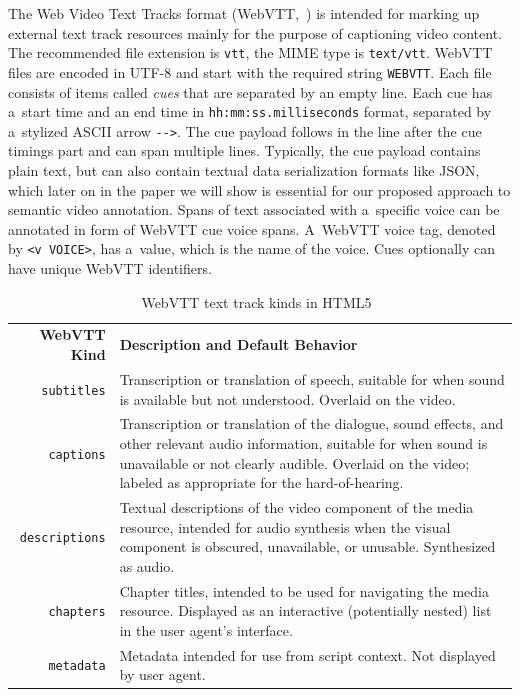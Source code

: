 \documentclass[runningheads,a4paper]{llncs}
\begin{document}
The Web Video Text Tracks format (WebVTT,~\cite{pfeiffer2013webvtt})
is intended for marking up external text track resources mainly
for the purpose of captioning video content.
The recommended file extension is \texttt{vtt},
the MIME type is \texttt{text/vtt}.
WebVTT files are encoded in UTF-8 and
start with the required string \texttt{WEBVTT}.
Each file consists of items called \emph{cues}
that are separated by an empty line.
Each cue has a~start time and an end time in
\texttt{hh:mm:ss.milliseconds} format,
separated by a~stylized ASCII arrow \texttt{-}\texttt{->}.
The cue payload follows in the line after the cue timings part
and can span multiple lines.
Typically, the cue payload contains plain text,
but can also contain textual data serialization formats like JSON,
which later on in the paper we will show is essential
for our proposed approach to semantic video annotation.
Spans of text associated with a~specific voice can be annotated
in form of WebVTT cue voice spans.
A~WebVTT voice tag, denoted by \texttt{<v VOICE>}, has a~value,
which is the name of the voice.
Cues optionally can have unique WebVTT identifiers.

\begin{table}[b!]\footnotesize
\begin{tabular}{ r p{9.5cm} }
\textbf{WebVTT Kind} & \textbf{Description and Default Behavior}\\

\texttt{subtitles} & Transcription or translation of speech,
suitable for when sound is available but not understood.
Overlaid on the video.\\

\texttt{captions} & Transcription or translation of the dialogue,
sound effects, and other relevant audio information,
suitable for when sound is unavailable or not clearly audible.
Overlaid on the video;
labeled as appropriate for the hard-of-hearing.\\

\texttt{descriptions} & Textual descriptions of the video component
of the media resource, intended for audio synthesis
when the visual component is obscured, unavailable, or unusable.
Synthesized as audio.\\

\texttt{chapters} & Chapter titles, intended to be used for navigating
the media resource. Displayed as an interactive (potentially nested)
list in the user agent's interface.\\

\texttt{metadata} & Metadata intended for use from script context.
Not displayed by user agent.\\
\end{tabular}
  \caption{WebVTT text track kinds in HTML5~\cite{berjon2013html5}}
  \label{table:texttrackkinds}
\end{table}
\end{document}
